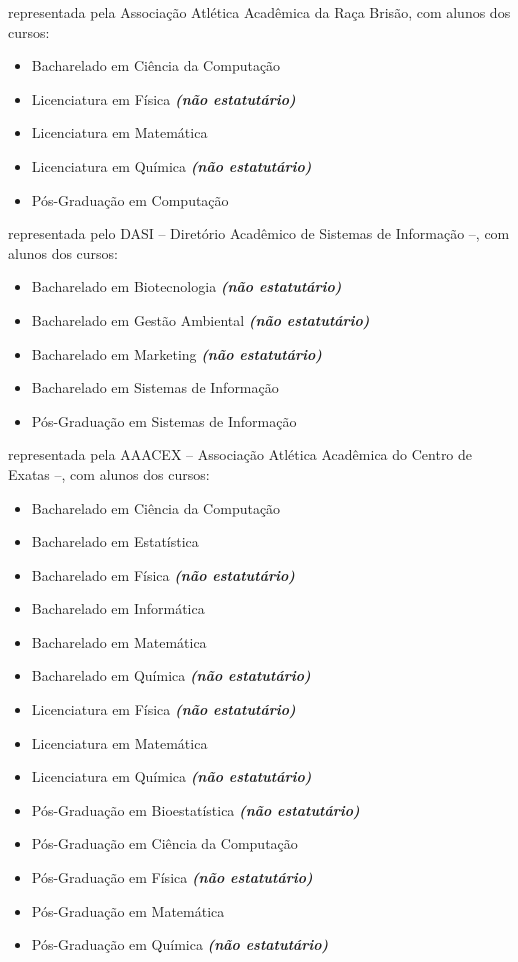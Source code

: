 \begin{article}
\begin{description}[noitemsep]
		\item[UFSCar - Sorocaba] representada pela Associação Atlética Acadêmica da Raça Brisão, com alunos dos cursos:
		\begin{itemize}[noitemsep]
			\item Bacharelado em Ciência da Computação
			\item Licenciatura em Física \textbf{\textit{(não estatutário)}}
			\item Licenciatura em Matemática
			\item Licenciatura em Química \textbf{\textit{(não estatutário)}}
			\item Pós-Graduação em Computação
		\end{itemize}

		\item[USP Leste - EACH] representada pelo DASI -- Diretório Acadêmico de Sistemas de Informação --, com alunos dos cursos:
		\begin{itemize}[noitemsep]
			\item Bacharelado em Biotecnologia \textbf{\textit{(não estatutário)}}
			\item Bacharelado em Gestão Ambiental \textbf{\textit{(não estatutário)}}
			\item Bacharelado em Marketing \textbf{\textit{(não estatutário)}}
			\item Bacharelado em Sistemas de Informação
			\item Pós-Graduação em Sistemas de Informação
		\end{itemize}

		\item[UEM] representada pela AAACEX -- Associação Atlética Acadêmica do Centro de Exatas --, com alunos dos cursos:
		\begin{itemize}[noitemsep]
			\item Bacharelado em Ciência da Computação
			\item Bacharelado em Estatística
			\item Bacharelado em Física \textbf{\textit{(não estatutário)}}
			\item Bacharelado em Informática
			\item Bacharelado em Matemática
			\item Bacharelado em Química \textbf{\textit{(não estatutário)}}
			\item Licenciatura em Física \textbf{\textit{(não estatutário)}}
			\item Licenciatura em Matemática
			\item Licenciatura em Química \textbf{\textit{(não estatutário)}}
			\item Pós-Graduação em Bioestatística \textbf{\textit{(não estatutário)}}
			\item Pós-Graduação em Ciência da Computação
			\item Pós-Graduação em Física \textbf{\textit{(não estatutário)}}
			\item Pós-Graduação em Matemática
			\item Pós-Graduação em Química \textbf{\textit{(não estatutário)}}
		\end{itemize}


\end{description}
\end{article}
